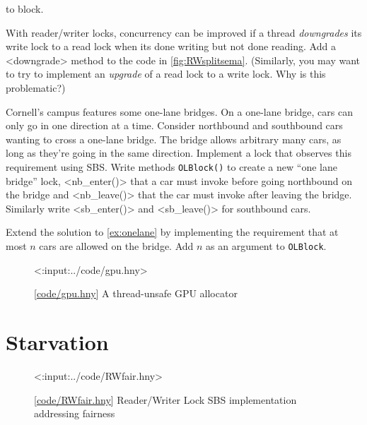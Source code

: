 \documentclass{report}
\newcommand{\harmonylink}[1]{%
[\href{https://harmony.cs.cornell.edu/#1}{\underline{#1}}]%
}
\newenvironment{code}{
\tcolorbox
}{
\endtcolorbox
}
\begin{document}
\begin{problems}
to block.
\item With reader/writer locks,
concurrency can be improved if a thread \emph{downgrades} its write lock
to a read lock when its done writing but not done reading.  Add
a <{downgrade}> method to the code in \autoref{fig:RWsplitsema}.
(Similarly, you may want to try to implement an \emph{upgrade} of a
read lock to a write lock.  Why is this problematic?)
\item \label{ex:onelane} Cornell's campus features some one-lane bridges.
On a one-lane bridge,
cars can only go in one direction at a time. Consider northbound
and southbound cars wanting to cross a one-lane bridge.
The bridge allows arbitrary many cars, as long as they're going in the
same direction.
Implement a lock that observes this requirement using SBS.
Write methods \texttt{OLBlock()} to create a new ``one lane bridge'' lock,
<{nb_enter()}> that a car must invoke before going northbound on
the bridge and <{nb_leave()}> that the car must invoke after leaving
the bridge.  Similarly write <{sb_enter()}> and <{sb_leave()}>
for southbound cars.
\item Extend the solution to \autoref{ex:onelane} by implementing the
requirement that at most $n$ cars are allowed on the bridge.  Add $n$
as an argument to \texttt{OLBlock}.

\end{problems}

\begin{figure}
\begin{code}
<{:input:../code/gpu.hny}>
\end{code}
\caption{\harmonylink{code/gpu.hny} A thread-unsafe GPU allocator}
\label{fig:gpu}
\end{figure}

\chapter{Starvation}
\label{ch:starvation}
%

%

\begin{figure}
\begin{code}
{\small
<{:input:../code/RWfair.hny}>
}
\end{code}
\caption{\harmonylink{code/RWfair.hny} Reader/Writer Lock SBS implementation addressing fairness}
\label{fig:RWfair}
\end{figure}
\end{document}
